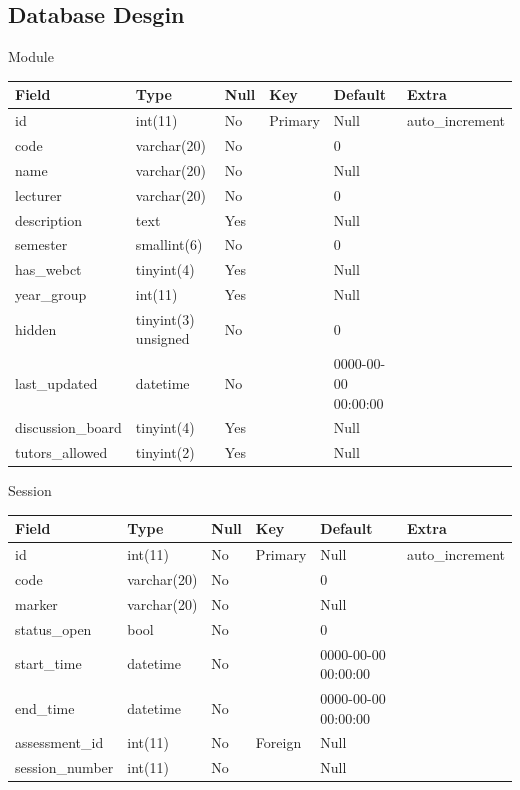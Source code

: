 \documentclass[12pt]{article}
\begin{document}
		\subsection{Database Desgin} %
						
					\caption{Module}
					\begin{tabular}{|p{1.0in}|p{0.9in}|p{0.5in}|p{0.4in}|p{1.0in}|p{0.9in}|} \hline 
					Field & Type & Null & Key & Default & Extra \\ \hline 
					id & int(11) & No & Primary & Null & auto\_increment \\ \hline 
					code & varchar(20) & No &  & 0 &  \\ \hline 
					name & varchar(20) & No &  & Null &  \\ \hline 
					lecturer  & varchar(20) & No &  & 0 &  \\ \hline 
					description & text & Yes &  & Null &  \\ \hline 
					semester & smallint(6) & No &  & 0 &  \\ \hline 
					has\_webct & tinyint(4) & Yes &  & Null &  \\ \hline 
					year\_group & int(11) & Yes &  & Null &  \\ \hline 
					hidden & tinyint(3) unsigned & No &  & 0 &  \\ \hline 
					last\_updated & datetime & No &  & 0000-00-00 00:00:00 &  \\ \hline 
					discussion\_board & tinyint(4) & Yes &  & Null &  \\ \hline 
					tutors\_allowed & tinyint(2) & Yes &  & Null &  \\ 
					\hline 
					\end{tabular}



					\caption{Session}
					\begin{tabular}{|p{1.0in}|p{0.9in}|p{0.5in}|p{0.4in}|p{1.0in}|p{0.9in}|} \hline 
					Field & Type & Null & Key & Default & Extra \\ \hline 
					id & int(11) & No & Primary & Null & auto\_increment \\ \hline 
					code & varchar(20) & No &  & 0 &  \\ \hline 
					marker & varchar(20) & No &  & Null &  \\ \hline 
					status\_open & bool & No &  & 0 &  \\ \hline 
					start\_time & datetime & No &  & 0000-00-00 00:00:00 &  \\ \hline 
					end\_time & datetime & No &  & 0000-00-00 00:00:00 &  \\ \hline 
					assessment\_id & int(11) & No & Foreign & Null &  \\ \hline 
					session\_number & int(11) & No &  & Null &  \\ \hline 
					\end{tabular}
					
\end{document}
